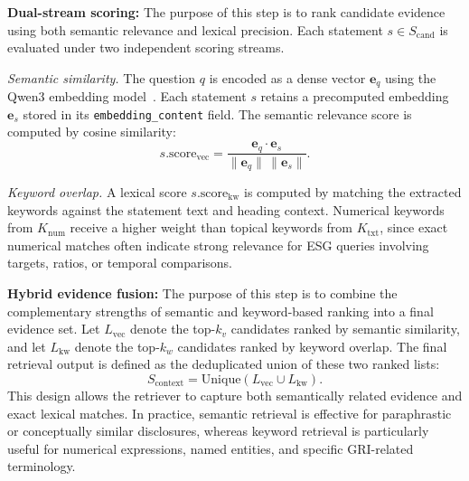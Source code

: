 \documentclass[sn-mathphys, oneside]{sn-jnl}
\begin{document}
\textbf{Dual-stream scoring:} The purpose of this step is to rank candidate evidence using both semantic relevance and lexical precision. Each statement $s \in S_{\text{cand}}$ is evaluated under two independent scoring streams.

\emph{Semantic similarity.}
The question $q$ is encoded as a dense vector $\mathbf{e}_q$ using the
Qwen3 embedding model~\cite{qwen2025}. Each statement $s$ retains a precomputed
embedding $\mathbf{e}_s$ stored in its \texttt{embedding\_content} field.
The semantic relevance score is computed by cosine similarity:
\begin{equation}
    s.\mathrm{score}_{\mathrm{vec}}
    = \frac{\mathbf{e}_q \cdot \mathbf{e}_s}{\|\mathbf{e}_q\|\,\|\mathbf{e}_s\|}.
    \label{eq:cosine}
\end{equation}

\emph{Keyword overlap.}
A lexical score $s.\mathrm{score}_{\mathrm{kw}}$ is computed by matching the extracted
keywords against the statement text and heading context. Numerical keywords from
$K_{\text{num}}$ receive a higher weight than topical keywords from $K_{\text{txt}}$,
since exact numerical matches often indicate strong relevance for ESG queries involving
targets, ratios, or temporal comparisons.

\textbf{Hybrid evidence fusion:} The purpose of this step is to combine the complementary strengths of semantic and keyword-based ranking into a final evidence set. Let $L_{\text{vec}}$ denote the
top-$k_v$ candidates ranked by semantic similarity, and let $L_{\text{kw}}$ denote
the top-$k_w$ candidates ranked by keyword overlap. The final retrieval output is
defined as the deduplicated union of these two ranked lists:
\begin{equation}
    S_{\text{context}} = \mathrm{Unique}\!\left(L_{\text{vec}} \cup L_{\text{kw}}\right).
    \label{eq:fusion}
\end{equation}
This design allows the retriever to capture both semantically related evidence and
exact lexical matches. In practice, semantic retrieval is effective for paraphrastic
or conceptually similar disclosures, whereas keyword retrieval is particularly useful
for numerical expressions, named entities, and specific GRI-related terminology.
\end{document}
